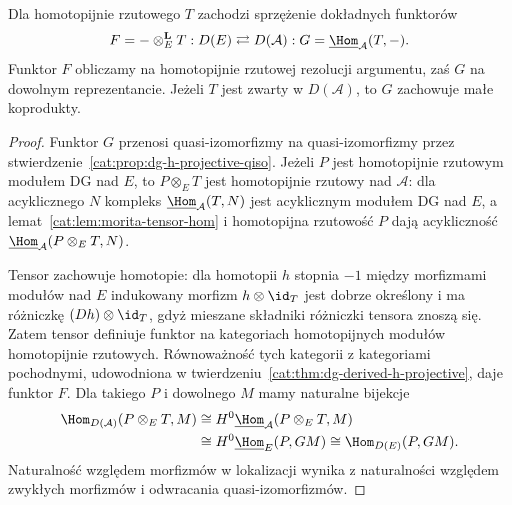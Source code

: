\begin{twierdzenie}\label{cat:thm:morita-derived-adjunction}
Dla homotopijnie rzutowego $T$ zachodzi sprzężenie dokładnych funktorów
\[
 F=-\otimes_E^{\mathbf L}T:D(E)
 \rightleftarrows D(\mathcal A):
 G=\underline{\Hom}_{\mathcal A}(T,-).
\]
Funktor $F$ obliczamy na homotopijnie rzutowej rezolucji argumentu, zaś $G$ na dowolnym reprezentancie. Jeżeli $T$ jest zwarty w $D(\mathcal A)$, to $G$ zachowuje małe koprodukty.
\end{twierdzenie}
\begin{proof}
Funktor $G$ przenosi quasi-izomorfizmy na quasi-izomorfizmy przez stwierdzenie~\ref{cat:prop:dg-h-projective-qiso}. Jeżeli $P$ jest homotopijnie rzutowym modułem DG nad $E$, to $P\otimes_E T$ jest homotopijnie rzutowy nad $\mathcal A$: dla acyklicznego $N$ kompleks $\underline{\Hom}_{\mathcal A}(T,N)$ jest acyklicznym modułem DG nad $E$, a lemat~\ref{cat:lem:morita-tensor-hom} i homotopijna rzutowość $P$ dają acykliczność $\underline{\Hom}_{\mathcal A}(P\otimes_E T,N)$.

Tensor zachowuje homotopie: dla homotopii $h$ stopnia $-1$ między morfizmami modułów nad $E$ indukowany morfizm $h\otimes\id_T$ jest dobrze określony i ma różniczkę $(Dh)\otimes\id_T$, gdyż mieszane składniki różniczki tensora znoszą się. Zatem tensor definiuje funktor na kategoriach homotopijnych modułów homotopijnie rzutowych. Równoważność tych kategorii z kategoriami pochodnymi, udowodniona w twierdzeniu~\ref{cat:thm:dg-derived-h-projective}, daje funktor $F$. Dla takiego $P$ i dowolnego $M$ mamy naturalne bijekcje
\[
\begin{aligned}
 \Hom_{D(\mathcal A)}(P\otimes_E T,M)
 &\cong H^0\underline{\Hom}_{\mathcal A}(P\otimes_E T,M)\\
 &\cong H^0\underline{\Hom}_E(P,G M)
 \cong\Hom_{D(E)}(P,G M).
\end{aligned}
\]
Naturalność względem morfizmów w lokalizacji wynika z naturalności względem zwykłych morfizmów i odwracania quasi-izomorfizmów.


\end{proof}
